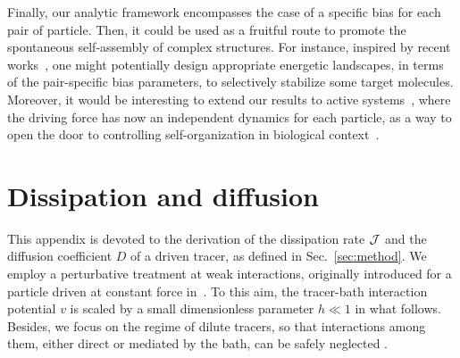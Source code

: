 \documentclass[pre, superscriptaddress, twocolumn,pre]{revtex4-1}
\begin{document}
Finally, our analytic framework encompasses the case of a specific bias for each pair of particle. Then, it could be used as a fruitful route to promote the spontaneous self-assembly of complex structures. For instance, inspired by recent works~\cite{Murugan2015, Murugan2017b}, one might potentially design appropriate energetic landscapes, in terms of the pair-specific bias parameters, to selectively stabilize some target molecules. Moreover, it would be interesting to extend our results to active systems~\cite{Marchetti2013, Cates2015, Bechinger2016, Marchetti2018}, where the driving force has now an independent dynamics for each particle, as a way to open the door to controlling self-organization in biological context~\cite{Sperandio2002, Brown2011, Betz2018}.








\appendix

\section{Dissipation and diffusion}\label{app:diff}

This appendix is devoted to the derivation of the dissipation rate $\cal J$ and the diffusion coefficient $D$ of a driven tracer, as defined in Sec.~\ref{sec:method}. We employ a perturbative treatment at weak interactions, originally introduced for a particle driven at constant force in~\cite{Demery2011, Demery2014}. To this aim, the tracer-bath interaction potential $v$ is scaled by a small dimensionless parameter $h\ll1$ in what follows. Besides, we focus on the regime of dilute tracers, so that interactions among them, either direct or mediated by the bath, can be safely neglected .
\end{document}
